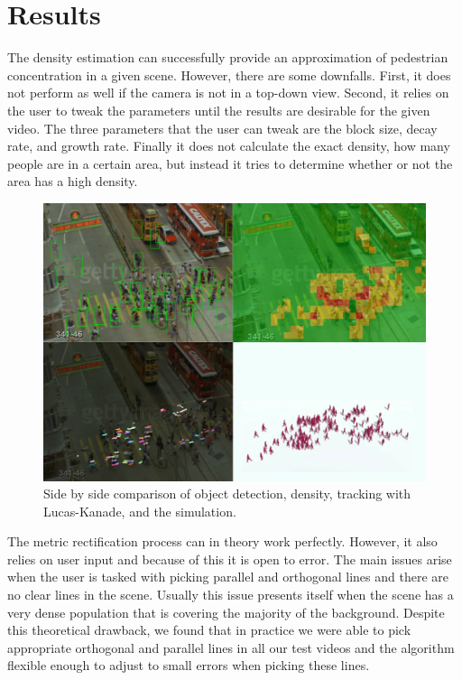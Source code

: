 \documentclass[12pt, onecolumn, conference]{IEEEtran}
\begin{document}
\section{Results}

The density estimation can successfully provide an approximation of pedestrian concentration in a given scene. However, there are some downfalls. First, it does not perform as well if the camera is not in a top-down view. Second, it relies on the user to tweak the parameters until the results are desirable for the given video. The three parameters that the user can tweak are the block size, decay rate, and growth rate. Finally it does not calculate the exact density, how many people are in a certain area, but instead it tries to determine whether or not the area has a high density.

\begin{figure}[!t]
\centering
\includegraphics[width=6in]{Screenshots/combinationimage1.png}
\caption{Side by side comparison of object detection, density, tracking with Lucas-Kanade, and the simulation.}
\label{Combination}
\end{figure}

The metric rectification process can in theory work perfectly. However, it also relies on user input and because of this it is open to error. The main issues arise when the user is tasked with picking parallel and orthogonal lines and there are no clear lines in the scene. Usually this issue presents itself when the scene has a very dense population that is covering the majority of the background. Despite this theoretical drawback, we found that in practice we were able to pick appropriate orthogonal and parallel lines in all our test videos and the algorithm flexible enough to adjust to small errors when picking these lines.
\end{document}

